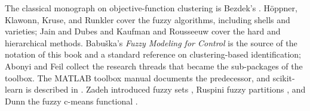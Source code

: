 The classical monograph on objective-function clustering is Bezdek's \cite{bezdek:1981}. H\"oppner, Klawonn, Kruse, and Runkler \cite{hoppner:1999:book} cover the fuzzy algorithms, including shells and varieties; Jain and Dubes \cite{jain:1988:book} and Kaufman and Rousseeuw \cite{kaufman:1990:groups} cover the hard and hierarchical methods. Babu\v{s}ka's \emph{Fuzzy Modeling for Control} \cite{babuska:1998:book} is the source of the notation of this book and a standard reference on clustering-based identification; Abonyi and Feil \cite{abonyi:2007:book} collect the research threads that became the sub-packages of the toolbox. The MATLAB toolbox manual \cite{balasko:2005:toolbox} documents the predecessor, and scikit-learn is described in \cite{pedregosa:2011:sklearn}. Zadeh introduced fuzzy sets \cite{zadeh:1965:fuzzysets}, Ruspini fuzzy partitions \cite{ruspini:1969}, and Dunn the fuzzy c-means functional \cite{dunn:1973:fcm}.
